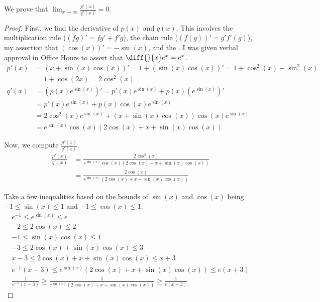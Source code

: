 \documentclass[11pt]{article}
\begin{document}
        We prove that $\lim_{x \to \infty} \frac{p'(x)}{q'(x)} = 0$.
        \begin{proof}
            First, we find the derivative of $p(x)$ and $q(x)$.
            This involves the multiplication rule ($(fg)' = fg' + f'g$), the chain rule ($(f(g))' = g'f'(g)$), my assertion that $(\cos(x))' = -\sin(x)$, and the .
            I was given verbal approval in Office Hours to assert that $\diff{}{x}e^x = e^x$.
            \begin{align}
                p'(x)   &=  \left( x + \sin(x)\cos(x) \right)'
                    =   1 + \left( \sin(x)\cos(x) \right)'
                    =   1 + \cos^2(x) - \sin^2(x)\\
                    &=  1 + \cos(2x)
                    =   2\cos^2(x)\\
                q'(x)   &=  \left( p(x) e^{\sin(x)} \right)'
                    =   p'(x)e^{\sin(x)} + p(x)\left( e^{\sin(x)} \right)'\\
                    &=  p'(x)e^{\sin(x)} + p(x)\cos(x)e^{\sin(x)}\\
                    &=  2\cos^2(x) e^{\sin(x)} + \left( x + \sin(x)\cos(x) \right)\cos(x)e^{\sin(x)}\\
                    &=  e^{\sin(x)}\cos(x)\left( 2\cos(x) + x + \sin(x)\cos(x) \right)
            \end{align}

            Now, we compute $\frac{p'(x)}{q'(x)}$.
            \begin{align}
                \frac{p'(x)}{q'(x)} &=  \frac{2\cos^2(x)}{e^{\sin(x)}\cos(x)\left( 2\cos(x) + x + \sin(x)\cos(x) \right)}\\
                    &=  \frac{2\cos(x)}{e^{\sin(x)}\left( 2\cos(x) + x + \sin(x)\cos(x) \right)}
            \end{align}

            Take a few inequalities based on the bounds of $\sin(x)$ and $\cos(x)$ being $-1 \leq \sin(x) \leq 1$ and $-1 \leq \cos(x) \leq 1$.
            \begin{gather}
                e^{-1} \leq e^{\sin(x)} \leq e\\
                -2 \leq 2\cos(x) \leq 2\\
                -1 \leq \sin(x) \cos(x) \leq 1\\
                -3 \leq 2\cos(x) + \sin(x) \cos(x) \leq 3\\
                x - 3 \leq 2\cos(x) + x + \sin(x) \cos(x) \leq x + 3\\
                e^{-1} \left( x - 3 \right) \leq e^{\sin(x)} \left( 2\cos(x) + x + \sin(x) \cos(x) \right) \leq e\left( x + 3 \right)\\
                \frac{1}{e^{-1} \left( x - 3 \right)} \geq \frac{1}{e^{\sin(x)} \left( 2\cos(x) + x + \sin(x) \cos(x) \right)} \geq \frac{1}{e\left( x + 3 \right)}
            \end{gather}


\end{proof}
\end{document}

